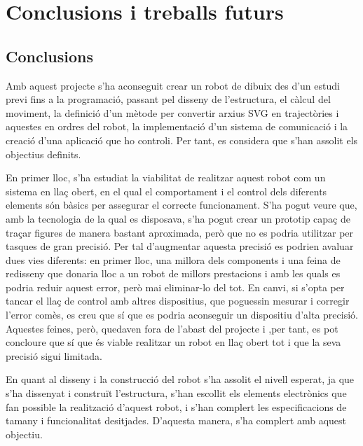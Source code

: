 \setlength\topmargin{8mm}
\onehalfspacing
\chapter{Conclusions i treballs futurs} %

\label{Chapter9} %




\section{Conclusions}

Amb aquest projecte s'ha aconseguit crear un robot de dibuix des d'un estudi previ fins a la programació, passant pel disseny de l'estructura, el càlcul del moviment, la definició d'un mètode per convertir arxius SVG en trajectòries i aquestes en ordres del robot, la implementació d'un sistema de comunicació i la creació d'una aplicació que ho controli. Per tant, es considera que s'han assolit els objectius definits.

En primer lloc, s'ha estudiat la viabilitat de realitzar aquest robot com un sistema en llaç obert, en el qual el comportament i el control dels diferents elements són bàsics per assegurar el correcte funcionament. S'ha pogut veure que, amb la tecnologia de la qual es disposava, s'ha pogut crear un prototip capaç de traçar figures de manera bastant aproximada, però que no es podria utilitzar per tasques de gran precisió. Per tal d'augmentar aquesta precisió es podrien avaluar dues vies diferents: en primer lloc, una millora dels components i una feina de redisseny que donaria lloc a un robot de millors prestacions i amb les quals es podria reduir aquest error, però mai eliminar-lo del tot. En canvi, si s'opta per tancar el llaç de control amb altres dispositius, que poguessin mesurar i corregir l'error comès, es creu que sí que es podria aconseguir un dispositiu d'alta precisió. Aquestes feines, però, quedaven fora de l'abast del projecte i ,per tant, es pot concloure que sí que és viable realitzar un robot en llaç obert tot i que la seva precisió sigui limitada. 

En quant al disseny i la construcció del robot s'ha assolit el nivell esperat, ja que s'ha dissenyat i construït l'estructura, s'han escollit els elements electrònics que fan possible la realització d'aquest robot, i s'han complert les especificacions de tamany i funcionalitat desitjades. D'aquesta manera, s'ha complert amb aquest objectiu.


